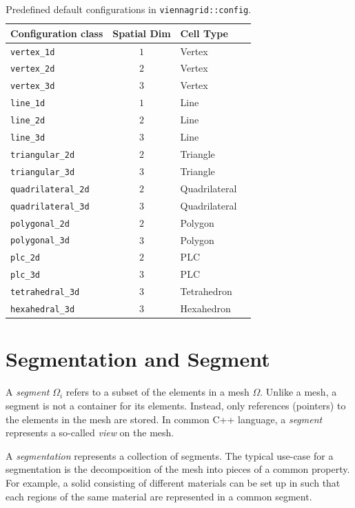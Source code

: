 \begin{table}[tbp]
 \centering
 \renewcommand{\arraystretch}{1.3}
\begin{tabular}{|l|c|l|l|}
\hline
 Configuration class  & Spatial Dim & Cell Type \\
\hline
 \lstinline|vertex_1d|          & $1$ & Vertex \\
 \lstinline|vertex_2d|          & $2$ & Vertex \\
 \lstinline|vertex_3d|          & $3$ & Vertex \\
 \lstinline|line_1d|            & $1$ & Line \\
 \lstinline|line_2d|            & $2$ & Line \\
 \lstinline|line_3d|            & $3$ & Line \\
 \lstinline|triangular_2d|      & $2$ & Triangle \\
 \lstinline|triangular_3d|      & $3$ & Triangle \\
 \lstinline|quadrilateral_2d|   & $2$ & Quadrilateral \\
 \lstinline|quadrilateral_3d|   & $3$ & Quadrilateral \\
 \lstinline|polygonal_2d|       & $2$ & Polygon \\
 \lstinline|polygonal_3d|       & $3$ & Polygon \\
 \lstinline|plc_2d|             & $2$ & PLC \\
 \lstinline|plc_3d|             & $3$ & PLC \\
 \lstinline|tetrahedral_3d|     & $3$ & Tetrahedron \\
 \lstinline|hexahedral_3d|      & $3$ & Hexahedron \\
\hline
\end{tabular}
\caption{Predefined default configurations in \lstinline|viennagrid::config|.}
\label{tab:mesh-configs}
\end{table}

\section{Segmentation and Segment}
A \emph{segment} $\Omega_i$ refers to a subset of the elements in a mesh $\Omega$. Unlike a mesh, a segment is not a container for its elements. Instead, only references (pointers) to the elements in the mesh are stored. In common C++ language, a \emph{segment} represents a so-called \emph{view} on the mesh.

A \emph{segmentation} represents a collection of segments. The typical use-case for a segmentation is the decomposition of the mesh into pieces of a common property. For example, a solid consisting of different materials can be set up in {\ViennaGrid} such that each regions of the same material are represented in a common segment.
